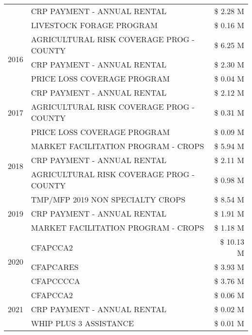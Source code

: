 \begin{tabular}{llr}
 & CRP PAYMENT - ANNUAL RENTAL & \$ 2.28 M \\
 & LIVESTOCK FORAGE PROGRAM & \$ 0.16 M \\
\cline{1-3}
\multirow[t]{3}{*}{2016} & AGRICULTURAL RISK COVERAGE PROG - COUNTY & \$ 6.25 M \\
 & CRP PAYMENT - ANNUAL RENTAL & \$ 2.30 M \\
 & PRICE LOSS COVERAGE PROGRAM & \$ 0.04 M \\
\cline{1-3}
\multirow[t]{3}{*}{2017} & CRP PAYMENT - ANNUAL RENTAL & \$ 2.12 M \\
 & AGRICULTURAL RISK COVERAGE PROG - COUNTY & \$ 0.31 M \\
 & PRICE LOSS COVERAGE PROGRAM & \$ 0.09 M \\
\cline{1-3}
\multirow[t]{3}{*}{2018} & MARKET FACILITATION PROGRAM - CROPS & \$ 5.94 M \\
 & CRP PAYMENT - ANNUAL RENTAL & \$ 2.11 M \\
 & AGRICULTURAL RISK COVERAGE PROG - COUNTY & \$ 0.98 M \\
\cline{1-3}
\multirow[t]{3}{*}{2019} & TMP/MFP 2019 NON SPECIALTY CROPS & \$ 8.54 M \\
 & CRP PAYMENT - ANNUAL RENTAL & \$ 1.91 M \\
 & MARKET FACILITATION PROGRAM - CROPS & \$ 1.18 M \\
\cline{1-3}
\multirow[t]{3}{*}{2020} & CFAPCCA2 & \$ 10.13 M \\
 & CFAPCARES & \$ 3.93 M \\
 & CFAPCCCCA & \$ 3.76 M \\
\cline{1-3}
\multirow[t]{3}{*}{2021} & CFAPCCA2 & \$ 0.06 M \\
 & CRP PAYMENT - ANNUAL RENTAL & \$ 0.02 M \\
 & WHIP PLUS 3 ASSISTANCE & \$ 0.01 M \\
\cline{1-3}
\bottomrule
\end{tabular}
